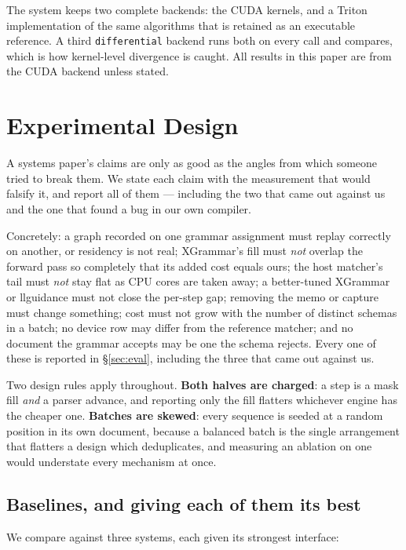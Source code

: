 \documentclass{article}
\begin{document}
The system keeps two complete backends: the CUDA kernels, and a Triton
implementation of the same algorithms that is retained as an executable
reference. A third \texttt{differential} backend runs both on every call and
compares, which is how kernel-level divergence is caught. All results in this
paper are from the CUDA backend unless stated.

\section{Experimental Design}
\label{sec:design-exp}

A systems paper's claims are only as good as the angles from which someone
tried to break them. We state each claim with the measurement that would
falsify it, and report all of them --- including the two that came out against
us and the one that found a bug in our own compiler.

Concretely: a graph recorded on one grammar assignment must replay correctly on
another, or residency is not real; XGrammar's fill must \emph{not} overlap the
forward pass so completely that its added cost equals ours; the host matcher's
tail must \emph{not} stay flat as CPU cores are taken away; a better-tuned
XGrammar or llguidance must not close the per-step gap; removing the memo or
capture must change something; cost must not grow with the number of distinct
schemas in a batch; no device row may differ from the reference matcher; and no
document the grammar accepts may be one the schema rejects. Every one of these
is reported in \S\ref{sec:eval}, including the three that came out against us.

Two design rules apply throughout. \textbf{Both halves are charged}: a step is a
mask fill \emph{and} a parser advance, and reporting only the fill flatters
whichever engine has the cheaper one. \textbf{Batches are skewed}: every
sequence is seeded at a random position in its own document, because a balanced
batch is the single arrangement that flatters a design which deduplicates, and
measuring an ablation on one would understate every mechanism at once.

\subsection{Baselines, and giving each of them its best}
\label{sec:baselines}

We compare against three systems, each given its strongest interface:
\end{document}
